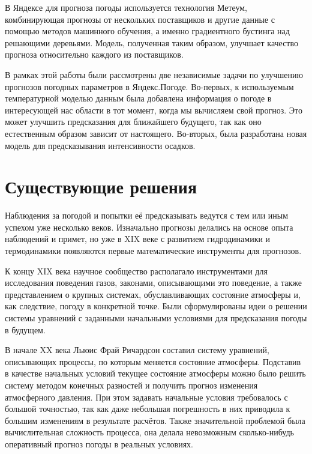 \documentclass[14pt]{matmex-diploma}
\begin{document}
В Яндексе для прогноза погоды используется технология Метеум, комбинирующая прогнозы от нескольких поставщиков и другие данные с помощью методов машинного обучения, а именно градиентного бустинга над решающими деревьями. Модель, полученная таким образом, улучшает качество прогноза относительно каждого из поставщиков.

В рамках этой работы были рассмотрены две независимые задачи по улучшению прогнозов погодных параметров в Яндекс.Погоде. Во-первых, к используемым температурной моделью данным была добавлена информация о погоде в интересующей нас области в тот момент, когда мы вычисляем свой прогноз. Это может улучшить предсказания для ближайшего будущего, так как оно естественным образом зависит от настоящего. Во-вторых, была разработана новая модель для предсказывания интенсивности осадков.



\section{Существующие решения}




Наблюдения за погодой и попытки её предсказывать ведутся с тем или иным успехом уже несколько веков. Изначально прогнозы делались на основе опыта наблюдений и примет, но уже в XIX веке с развитием гидродинамики и термодинамики появляются первые математические инструменты для прогнозов. 

К концу XIX века научное сообщество располагало инструментами для исследования поведения газов, законами, описывающими это поведение, а также представлением о крупных системах, обуславливающих состояние атмосферы и, как следствие, погоду в конкретной точке. Были сформулированы идеи о решении системы уравнений с заданными начальными условиями для предсказания погоды в будущем.

В начале XX века Льюис Фрай Ричардсон составил систему уравнений, описывающих процессы, по которым меняется состояние атмосферы. Подставив в качестве начальных условий текущее состояние атмосферы можно было решить систему методом конечных разностей и получить прогноз изменения атмосферного давления\cite{lynch2008origins}. При этом задавать начальные условия требовалось с большой точностью, так как даже небольшая погрешность в них приводила к большим изменениям в результате расчётов. Также значительной проблемой была вычислительная сложность процесса, она делала невозможным сколько-нибудь оперативный прогноз погоды в реальных условиях.
\end{document}
